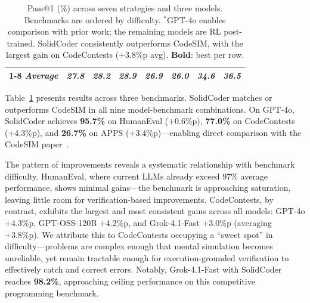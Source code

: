 \documentclass[11pt]{article}
\begin{document}
\begin{table}[t]
{\begin{tabular}{@{}l|ccccc|cc@{}}
        \cmidrule{1-8}
        \textit{Average} & \textit{27.8} & \textit{28.2} & \textit{28.9} & \textit{26.9} & \textit{26.0} & \textit{34.6} & \textit{\textbf{36.5}} \\
        \bottomrule
    \end{tabular}}
    \caption{Pass@1 (\%) across seven strategies and three models. Benchmarks are ordered by difficulty. $^*$GPT-4o enables comparison with prior work; the remaining models are RL post-trained. SolidCoder consistently outperforms CodeSIM, with the largest gain on CodeContests (+3.8\%p avg). \textbf{Bold}: best per row.}
    \label{tab:main_and_multimodel}
\end{table}

Table~\ref{tab:main_and_multimodel} presents results across three benchmarks. SolidCoder matches or outperforms CodeSIM in all nine model-benchmark combinations. On GPT-4o, SolidCoder achieves \textbf{95.7\%} on HumanEval (+0.6\%p), \textbf{77.0\%} on CodeContests (+4.3\%p), and \textbf{26.7\%} on APPS (+3.4\%p)---enabling direct comparison with the CodeSIM paper~\citep{islam2025codesim}.

The pattern of improvements reveals a systematic relationship with benchmark difficulty. HumanEval, where current LLMs already exceed 97\% average performance, shows minimal gains---the benchmark is approaching saturation, leaving little room for verification-based improvements. CodeContests, by contrast, exhibits the largest and most consistent gains across all models: GPT-4o +4.3\%p, GPT-OSS-120B +4.2\%p, and Grok-4.1-Fast +3.0\%p (averaging +3.8\%p). We attribute this to CodeContests occupying a ``sweet spot'' in difficulty---problems are complex enough that mental simulation becomes unreliable, yet remain tractable enough for execution-grounded verification to effectively catch and correct errors. Notably, Grok-4.1-Fast with SolidCoder reaches \textbf{98.2\%}, approaching ceiling performance on this competitive programming benchmark.
\end{document}
